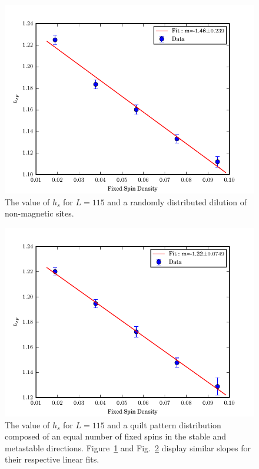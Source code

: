 \begin{figure}[!h]
  \centering
      \includegraphics[scale=1.0]{Figures/spinodal/fixSpin0_115.pdf}
  \caption{The value of $h_s$ for  $L=115$ and a randomly distributed dilution of non-magnetic sites.}
  \label{fig:ps_heter_0}
\end{figure}%
\begin{figure}[!h]
  \centering
      \includegraphics[scale=1.0]{Figures/spinodal/fixSpin1bQ_115.pdf}
  \caption{The value of $h_s$ for  $L=115$  and a quilt pattern distribution composed of an equal number of fixed spins in the stable and metastable directions. Figure~\ref{fig:ps_heter_0} and  Fig.~\ref{fig:ps_heter_pn} display similar slopes for their respective linear fits.}
  \label{fig:ps_heter_pn}
\end{figure}%

